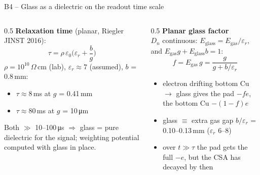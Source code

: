 \documentclass[aspectratio=169,11pt]{beamer}
\newcommand{\backlink}[1]{\hfill\hyperlink{#1}{\beamerreturnbutton{back}}}
\newcommand{\er}{\varepsilon_r}
\begin{document}
\begin{frame}[label=b-tau]{B4 -- Glass as a dielectric on the readout time scale}
  \small
  \begin{columns}[T]
    \begin{column}{0.5\textwidth}
      \textbf{Relaxation time} (planar, Riegler JINST 2016):
      \[ \tau = \rho\,\varepsilon_0\Big(\er + \frac{b}{g}\Big) \]
      $\rho = 10^{10}\,\Omega\,$cm (lab), $\er\approx7$ (assumed), $b$ = 0.8\,mm:
      \begin{itemize}
        \item $\tau\approx 8$\,ms at $g$ = 0.41\,mm
        \item $\tau\approx 80$\,ms at $g$ = 10\,\si{\micro m}
      \end{itemize}
      Both $\gg$ 10--100\,\si{\micro s} $\Rightarrow$ glass = pure dielectric for the signal; weighting potential computed with glass in place.
    \end{column}
    \begin{column}{0.5\textwidth}
      \textbf{Planar glass factor}\\
      $D_n$ continuous: $E_\text{glass} = E_\text{gas}/\er$, and $E_\text{gas}g + E_\text{glass}b = 1$:
      \[ f = E_\text{gas}\,g = \frac{g}{g + b/\er} \]
      \begin{itemize}
        \item electron drifting bottom Cu $\to$ glass gives the pad $-fe$, the bottom Cu $-(1-f)e$
        \item glass $\equiv$ extra gas gap $b/\er$ = 0.10--0.13\,mm ($\er$ 6--8)
        \item over $t\gg\tau$ the pad gets the full $-e$, but the CSA has decayed by then
      \end{itemize}
    \end{column}
  \end{columns}
  \backlink{m-glass}
\end{frame}
\end{document}
